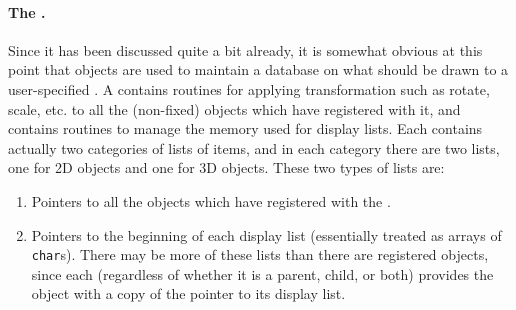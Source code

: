 \paragraph{The .}
Since it has been discussed quite a bit already, it is somewhat obvious at this point that  objects are used to maintain a database on what should be drawn to a user-specified .  A  contains routines for applying transformation such as rotate, scale, etc. to all the (non-fixed)  objects which have registered with it, and contains routines to manage the memory used for display lists.  Each  contains actually two categories of lists of items, and in each category there are two lists, one for 2D objects and one for 3D objects.  These two types of lists are:
\begin{enumerate}
  \item Pointers to all the  objects which have registered with the .
  \item Pointers to the beginning of each display list (essentially treated as arrays of {\tt char}s).  There may be more of these lists than there are registered  objects, since each  (regardless of whether it is a parent, child, or both) provides the  object with a copy of the pointer to its display list.
\end{enumerate}

